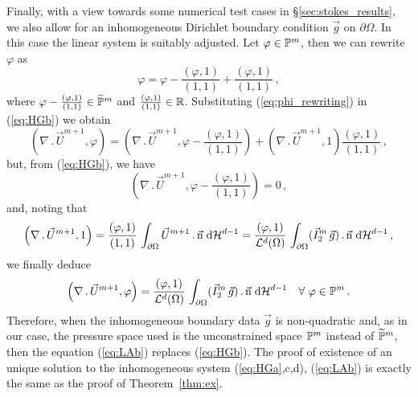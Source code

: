 Finally, with a view towards some numerical test cases in
\S\ref{sec:stokes_results}, we also allow for an inhomogeneous Dirichlet
boundary condition $\vec g$ on $\partial\Omega$. In this case the linear system
is suitably adjusted. Let $\varphi \in \mathbb{P}^m$, then we can rewrite
$\varphi$ as
\begin{equation}\label{eq:phi_rewriting}
\varphi=\varphi-\frac{\left(\varphi,1\right)}{\left(1,1\right)}
+\frac{\left(\varphi,1\right)}{\left(1,1\right)}\,,
\end{equation}
where $\varphi-\frac{(\varphi,1)}{(1,1)}\in\widetilde{\mathbb{P}}^m$ and
$\frac{(\varphi,1)}{(1,1)}\in{\mathbb R}$. Substituting (\ref{eq:phi_rewriting}) in
(\ref{eq:HGb}) we obtain
\begin{equation}
\left(\nabla\,.\,\vec U^{m+1}, \varphi\right)  =
\left(\nabla\,.\,\vec U^{m+1},
\varphi-\frac{\left(\varphi,1\right)}{\left(1,1\right)}\right) +
\left(\nabla\,.\,\vec U^{m+1},1\right)
\frac{\left(\varphi,1\right)}{\left(1,1\right)}\,,
\end{equation}
but, from (\ref{eq:HGb}), we have
\begin{equation}
\left(\nabla\,.\,\vec U^{m+1},
\varphi-\frac{\left(\varphi,1\right)}{\left(1,1\right)}\right) = 0\,,
\end{equation}
and, noting that
\begin{equation}
\left(\nabla\,.\,\vec U^{m+1}, 1\right)=
\frac{\left(\varphi,1\right)}{\left(1,1\right)}\, \int_{\partial\Omega}
\vec U^{m+1}\,.\, \vec{\rm n} \;{\rm d}{\cal H}^{d-1}=
\frac{\left(\varphi,1\right)}{\mathcal{L}^d(\Omega)}\, \int_{\partial\Omega}
(\vec I^m_2\,\vec g) \,.\, \vec{\rm n} \;{\rm d}{\cal H}^{d-1}\,,
\end{equation}
we finally deduce
\begin{equation} \label{eq:LAb}
 \left(\nabla\,.\,\vec U^{m+1}, \varphi\right) =
 \frac{\left(\varphi, 1\right)}{\mathcal{L}^d(\Omega)}\, \int_{\partial\Omega}
(\vec I^m_2\,\vec g) \,.\, \vec{\rm n} \;{\rm d}{\cal H}^{d-1} \quad \forall\ \varphi \in
\mathbb{P}^m\,.
\end{equation}
Therefore, when the inhomogeneous boundary data $\vec g$ is non-quadratic and,
as in our case, the pressure space used is the unconstrained space $\mathbb{P}^m$
instead of $\widetilde{\mathbb{P}}^m$, then the equation (\ref{eq:LAb}) replaces
(\ref{eq:HGb}). The proof of existence of an unique solution to the
inhomogeneous system (\ref{eq:HGa},c,d), (\ref{eq:LAb}) is exactly the same as
the proof of Theorem~\ref{thm:ex}.

